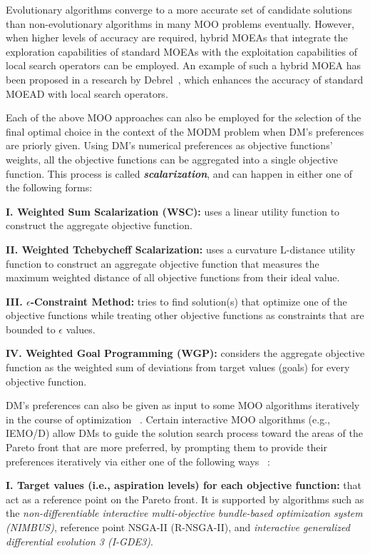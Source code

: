 \documentclass{sfuthesis}
\begin{document}
Evolutionary algorithms converge to a more accurate set of candidate solutions than non-evolutionary algorithms in many MOO problems eventually. However, when higher levels of accuracy are required, hybrid MOEAs that integrate the exploration capabilities of standard MOEAs with the exploitation capabilities of local search operators can be employed. An example of such a hybrid MOEA has been proposed in a research by Debrel~\cite{derbel2025simple}, which enhances the accuracy of standard MOEAD with local search operators.\par
Each of the above MOO approaches can also be employed for the selection of the final optimal choice in the context of the MODM problem when DM’s preferences are priorly given. Using DM’s numerical preferences as objective functions’ weights, all the objective functions can be aggregated into a single objective function. This process is called \textbf{\textit{scalarization}}, and can happen in either one of the following forms:\par
\textbf{I. Weighted Sum Scalarization (WSC):} uses a linear utility function to construct the aggregate objective function.\par
\textbf{II. Weighted Tchebycheff Scalarization:} uses a curvature L-distance utility function to construct an aggregate objective function that measures the maximum weighted distance of all objective functions from their ideal value.\par
\textbf{III. $\epsilon$-Constraint Method:} tries to find solution(s) that optimize one of the objective functions while treating other objective functions as constraints that are bounded to $\epsilon$ values.\par
\textbf{IV. Weighted Goal Programming (WGP):} considers the aggregate objective function as the weighted sum of deviations from target values (goals) for every objective function.\par
DM’s preferences can also be given as input to some MOO algorithms iteratively in the course of optimization ~\cite{osika2023multi}. Certain interactive MOO algorithms (e.g., IEMO/D) allow DMs to guide the solution search process toward the areas of the Pareto front that are more preferred, by prompting them to provide their preferences iteratively via either one of the following ways ~\cite{thiele2009preference}:\par
\textbf{I. Target values (i.e., aspiration levels) for each objective function:} that act as a reference point on the Pareto front. It is supported by algorithms such as the \textit{non-differentiable interactive multi-objective bundle-based optimization system (NIMBUS)}, reference point NSGA-II (R-NSGA-II), and \textit{interactive generalized differential evolution 3 (I-GDE3)}. \par
\end{document}
